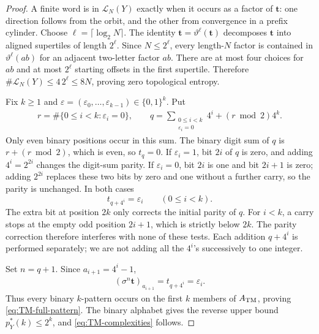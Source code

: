 \documentclass[11pt,reqno]{amsart}
\numberwithin{equation}{section}
\theoremstyle{definition}
\newcommand{\Lcal}{\mathcal L}
\begin{document}
\begin{proof}
A finite word is in $\Lcal_N(Y)$ exactly when it occurs as a factor of
$\mathbf t$: one direction follows from the orbit, and the other from
convergence in a prefix cylinder.  Choose $\ell=\lceil\log_2N\rceil$.  The
identity $\mathbf t=\vartheta^\ell(\mathbf t)$ decomposes $\mathbf t$ into
aligned supertiles of length $2^\ell$.  Since $N\le2^\ell$, every length-$N$
factor is contained in $\vartheta^\ell(ab)$ for an adjacent two-letter factor
$ab$.  There are at most four choices for $ab$ and at most $2^\ell$ starting
offsets in the first supertile.  Therefore
$\#\Lcal_N(Y)\le4\,2^\ell\le8N$, proving zero topological entropy.

Fix $k\ge1$ and
$\varepsilon=(\varepsilon_0,\ldots,\varepsilon_{k-1})\in\{0,1\}^k$.
Put
\begin{align*}
 r=\#\{0\le i<k:\varepsilon_i=0\},
 \qquad
 q=\sum_{\substack{0\le i<k\\\varepsilon_i=0}}4^i
 +(r\bmod2)4^k.
\end{align*}
Only even binary positions occur in this sum.  The binary digit sum of $q$ is
$r+(r\bmod2)$, which is even, so $t_q=0$.  If $\varepsilon_i=1$, bit $2i$
of $q$ is zero, and adding $4^i=2^{2i}$ changes the digit-sum parity.  If
$\varepsilon_i=0$, bit $2i$ is one and bit $2i+1$ is zero; adding $2^{2i}$
replaces these two bits by zero and one without a further carry, so the parity
is unchanged.  In both cases
\begin{equation}\label{eq:TM-digit-identity}
 t_{q+4^i}=\varepsilon_i\qquad(0\le i<k).
\end{equation}
The extra bit at position $2k$ only corrects the initial parity of $q$.
For $i<k$, a carry stops at the empty odd position $2i+1$, which is
strictly below $2k$. The parity correction therefore interferes with
none of these tests. Each addition $q+4^i$ is performed separately;
we are not adding all the $4^i$'s successively to one integer.

Set $n=q+1$. Since $a_{i+1}=4^i-1$,
\begin{align*}
 (\sigma^n\mathbf t)_{a_{i+1}}
 =t_{q+4^i}=\varepsilon_i.
\end{align*}
Thus every binary $k$-pattern occurs on the first $k$ members of
$A_{\rm TM}$, proving \eqref{eq:TM-full-pattern}.  The binary alphabet gives
the reverse upper bound $p_Y^*(k)\le2^k$, and
\eqref{eq:TM-complexities} follows.
\end{proof}
\end{document}
